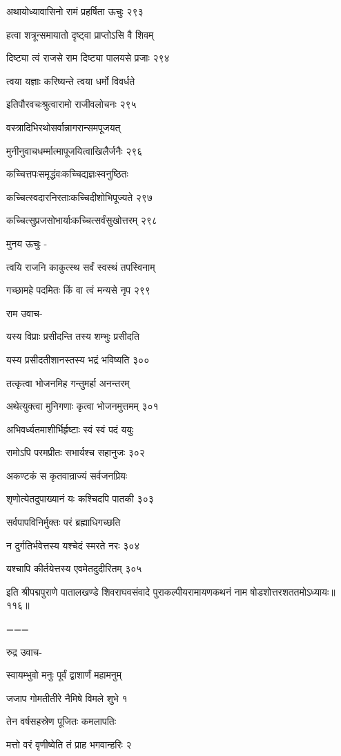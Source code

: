अथायोध्यावासिनो रामं प्रहर्षिता ऊचुः २९३

हत्वा शत्रून्समायातो दृष्ट्वा प्राप्तोऽसि वै शिवम्

दिष्ट्या त्वं राजसे राम दिष्ट्या पालयसे प्रजाः २९४

त्वया यज्ञाः करिष्यन्ते त्वया धर्मो विवर्धते

इतिपौरवचःश्रुत्वारामो राजीवलोचनः २९५

वस्त्रादिभिरथोसर्वान्नागरान्समपूजयत्

मुनीनुवाचधर्म्मात्मापूजयित्वाखिलैर्जनैः २९६

कच्चित्तपःसमृद्धंवःकच्चिद्यज्ञःस्वनुष्ठितः

कच्चित्स्वदारनिरताःकच्चिदीशोभिपूज्यते २९७

कच्चित्सुप्रजसोभार्याःकच्चित्सर्वंसुखोत्तरम् २९८

मुनय ऊचुः -

त्वयि राजनि काकुत्स्थ सर्वं स्वस्थं तपस्विनाम्

गच्छामहे पदमितः किं वा त्वं मन्यसे नृप २९९

राम उवाच-

यस्य विप्राः प्रसीदन्ति तस्य शम्भुः प्रसीदति

यस्य प्रसीदतीशानस्तस्य भद्रं भविष्यति ३००

तत्कृत्वा भोजनमिह गन्तुमर्हा अनन्तरम्

अथेत्युक्त्वा मुनिगणाः कृत्वा भोजनमुत्तमम् ३०१

अभिवर्ध्यतमाशीर्भिर्हृष्टाः स्वं स्वं पदं ययुः

रामोऽपि परमप्रीतः सभार्यश्च सहानुजः ३०२

अकण्टकं स कृतवान्राज्यं सर्वजनप्रियः

शृणोत्येतदुपाख्यानं यः कश्चिदपि पातकी ३०३

सर्वपापविनिर्मुक्तः परं ब्रह्माधिगच्छति

न दुर्गतिर्भवेत्तस्य यश्चेदं स्मरते नरः ३०४

यश्चापि कीर्तयेत्तस्य एवमेतदुदीरितम् ३०५

इति श्रीपद्मपुराणे पातालखण्डे शिवराघवसंवादे पुराकल्पीयरामायणकथनं नाम षोडशोत्तरशततमोऽध्यायः॥११६॥


===


रुद्र उवाच-

स्वायम्भुवो मनुः पूर्वं द्वाशार्णं महामनुम्

जजाप गोमतीतीरे नैमिषे विमले शुभे १

तेन वर्षसहस्रेण पूजितः कमलापतिः

मत्तो वरं वृणीष्वेति तं प्राह भगवान्हरिः २

